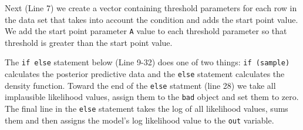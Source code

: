 \documentclass[]{book}
\newenvironment{Shaded}{\begin{snugshade}}{\end{snugshade}}
\newcommand{\ControlFlowTok}[1]{\textcolor[rgb]{0.13,0.29,0.53}{\textbf{#1}}}
\newcommand{\DataTypeTok}[1]{\textcolor[rgb]{0.13,0.29,0.53}{#1}}
\newcommand{\FloatTok}[1]{\textcolor[rgb]{0.00,0.00,0.81}{#1}}
\newcommand{\KeywordTok}[1]{\textcolor[rgb]{0.13,0.29,0.53}{\textbf{#1}}}
\newcommand{\NormalTok}[1]{#1}
\newcommand{\OperatorTok}[1]{\textcolor[rgb]{0.81,0.36,0.00}{\textbf{#1}}}
\newcommand{\OtherTok}[1]{\textcolor[rgb]{0.56,0.35,0.01}{#1}}
\newcommand{\StringTok}[1]{\textcolor[rgb]{0.31,0.60,0.02}{#1}}
\begin{document}
\begin{Shaded}
\end{Shaded}

Next (Line 7) we create a vector containing threshold parameters for each row in the data set that takes into account the condition and adds the start point value. We add the start point parameter \texttt{A} value to each threshold parameter so that threshold is greater than the start point value.

\begin{Shaded}
\end{Shaded}

The \texttt{if\ else} statement below (Line 9-32) does one of two things: \texttt{if\ (sample)} calculates the posterior predictive data and the \texttt{else} statement calculates the density function. Toward the end of the \texttt{else} statment (line 28) we take all implausible likelihood values, assign them to the \texttt{bad} object and set them to zero. The final line in the \texttt{else} statement takes the log of all likelihood values, sums them and then assigns the model's log likelihood value to the \texttt{out} variable.
\end{document}
